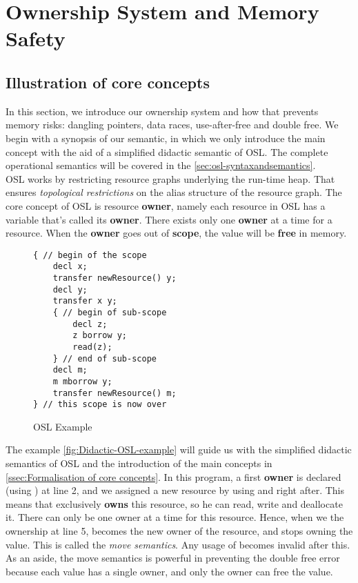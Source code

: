 
\section{Ownership System and Memory Safety}
\label{sec:ownership}

\subsection{Illustration of core concepts}
In this section, we introduce our ownership system and how that prevents memory risks: dangling pointers, data races, use-after-free and double free. 
We begin with a synopsis of our semantic, in which we only introduce the main concept with the aid of a simplified didactic semantic of OSL.
The complete operational semantics will be covered in the \autoref{sec:osl-syntaxandsemantics}.\\

OSL works by restricting resource graphs underlying the run-time heap.
That ensures \textit{topological restrictions} on the alias structure of the resource graph.
The core concept of OSL is resource \textbf{owner}, namely each resource in OSL has a variable that’s called its \textbf{owner}.
There exists only one \textbf{owner} at a time for a resource. When the \textbf{owner} goes out of \textbf{scope}, the value will be \textbf{free} in memory.\\

\begin{wrapfigure}{l}{0.5\linewidth}
\centering
\begin{lstlisting}[style=deno]
{ // begin of the scope
    decl x;
    transfer newResource() y;
    decl y; 
    transfer x y;
    { // begin of sub-scope
        decl z;
        z borrow y;                         
        read(z);                            
    } // end of sub-scope
    decl m;                             
    m mborrow y;                        
    transfer newResource() m;  
} // this scope is now over
\end{lstlisting}
\caption{OSL Example}
\label{fig:Didactic-OSL-example}
\end{wrapfigure}

The example \autoref{fig:Didactic-OSL-example} will guide us with the simplified didactic semantics of OSL and the introduction of the main concepts in \autoref{ssec:Formalisation of core concepts}. In this program, a first \textbf{owner}  is declared (using ) at line 2, and we assigned a new resource by using  and  right after.
This means that  exclusively \textbf{owns} this resource, so he can read, write and deallocate it. There can only be one owner at a time for this resource. Hence, when we  the ownership at line 5,  becomes the new owner of the resource, and  stops owning the value. This is called the \textit{move semantics}. Any usage of  becomes invalid after this. As an aside, the move semantics is powerful in preventing the double free error because each value has a single owner, and only the owner can free the value.\\

